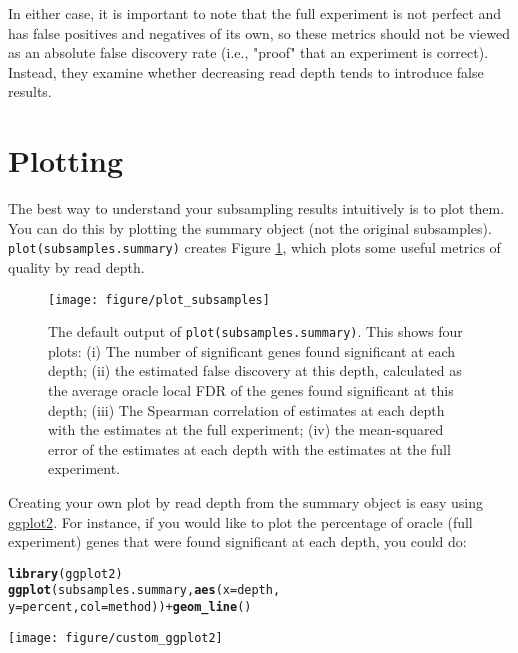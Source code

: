 \documentclass{article}\usepackage[]{graphicx}\usepackage[]{color}
\makeatletter
\def\maxwidth{ %
  \ifdim\Gin@nat@width>\linewidth
    \linewidth
  \else
    \Gin@nat@width
  \fi
}
\newcommand{\hlopt}[1]{\textcolor[rgb]{0,0,0}{#1}}%
\newcommand{\hlstd}[1]{\textcolor[rgb]{0.345,0.345,0.345}{#1}}%
\newcommand{\hlkwc}[1]{\textcolor[rgb]{0.333,0.667,0.333}{#1}}%
\newcommand{\hlkwd}[1]{\textcolor[rgb]{0.737,0.353,0.396}{\textbf{#1}}}%
\newenvironment{kframe}{%
 \def\at@end@of@kframe{}%
 \ifinner\ifhmode%
  \def\at@end@of@kframe{\end{minipage}}%
  \begin{minipage}{\columnwidth}%
 \fi\fi%
 \def\FrameCommand##1{\hskip\@totalleftmargin \hskip-\fboxsep
 \colorbox{shadecolor}{##1}\hskip-\fboxsep
     \hskip-\linewidth \hskip-\@totalleftmargin \hskip\columnwidth}%
 \MakeFramed {\advance\hsize-\width
   \@totalleftmargin\z@ \linewidth\hsize
   \@setminipage}}%
 {\par\unskip\endMakeFramed%
 \at@end@of@kframe}
\newenvironment{knitrout}{}{} %
\makeatother
\begin{document}
In either case, it is important to note that the full experiment is not perfect and has false positives and negatives of its own, so these metrics should not be viewed as an absolute false discovery rate (i.e., "proof" that an experiment is correct). Instead, they examine whether decreasing read depth tends to introduce false results.

\section{Plotting}

The best way to understand your subsampling results intuitively is to plot them. You can do this by plotting the summary object (not the original subsamples). \texttt{plot(subsamples.summary)} creates Figure \ref{fig:default_plot}, which plots some useful metrics of quality by read depth.

\begin{figure}
\begin{knitrout}
\color{fgcolor}
\texttt{[image: figure/plot\_subsamples]} 

\end{knitrout}
\caption{The default output of \texttt{plot(subsamples.summary)}. This shows four plots: (i) The number of significant genes found significant at each depth; (ii) the estimated false discovery at this depth, calculated as the average oracle local FDR of the genes found significant at this depth; (iii) The Spearman correlation of estimates at each depth with the estimates at the full experiment; (iv) the mean-squared error of the estimates at each depth with the estimates at the full experiment.\label{fig:default_plot}}
\end{figure}

Creating your own plot by read depth from the summary object is easy using \href{http://ggplot2.org/}{ggplot2}. For instance, if you would like to plot the percentage of oracle (full experiment) genes that were found significant at each depth, you could do:

\begin{knitrout}
\color{fgcolor}\begin{kframe}
\begin{alltt}
\hlkwd{library}\hlstd{(ggplot2)}
\hlkwd{ggplot}\hlstd{(subsamples.summary,} \hlkwd{aes}\hlstd{(}\hlkwc{x} \hlstd{= depth,}
    \hlkwc{y} \hlstd{= percent,} \hlkwc{col} \hlstd{= method))} \hlopt{+} \hlkwd{geom_line}\hlstd{()}
\end{alltt}
\end{kframe}
\texttt{[image: figure/custom\_ggplot2]} 

\end{knitrout}
\end{document}
